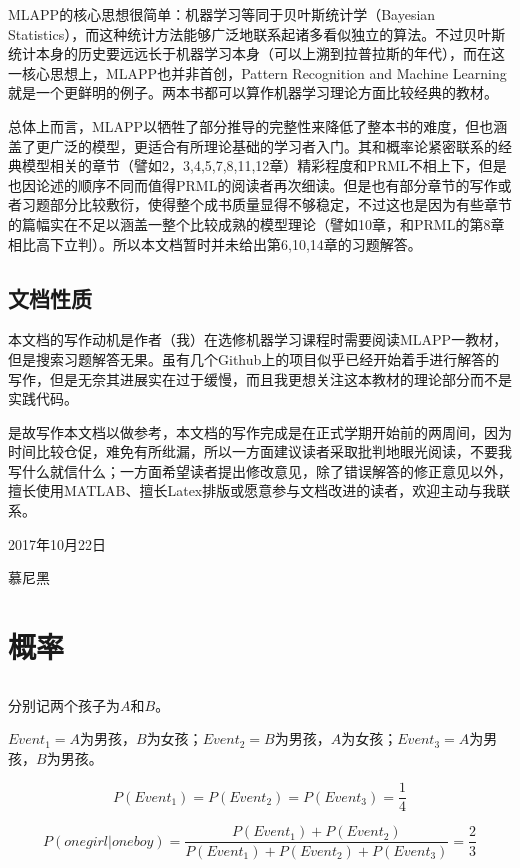 \documentclass[UTF8]{ctexart}
\begin{document}
MLAPP的核心思想很简单：机器学习等同于贝叶斯统计学（Bayesian Statistics），而这种统计方法能够广泛地联系起诸多看似独立的算法。不过贝叶斯统计本身的历史要远远长于机器学习本身（可以上溯到拉普拉斯的年代），而在这一核心思想上，MLAPP也并非首创，Pattern Recognition and Machine Learning就是一个更鲜明的例子。两本书都可以算作机器学习理论方面比较经典的教材。

总体上而言，MLAPP以牺牲了部分推导的完整性来降低了整本书的难度，但也涵盖了更广泛的模型，更适合有所理论基础的学习者入门。其和概率论紧密联系的经典模型相关的章节（譬如2，3,4,5,7,8,11,12章）精彩程度和PRML不相上下，但是也因论述的顺序不同而值得PRML的阅读者再次细读。但是也有部分章节的写作或者习题部分比较敷衍，使得整个成书质量显得不够稳定，不过这也是因为有些章节的篇幅实在不足以涵盖一整个比较成熟的模型理论（譬如10章，和PRML的第8章相比高下立判）。所以本文档暂时并未给出第6,10,14章的习题解答。

\subsection{文档性质}
本文档的写作动机是作者（我）在选修机器学习课程时需要阅读MLAPP一教材，但是搜索习题解答无果。虽有几个Github上的项目似乎已经开始着手进行解答的写作，但是无奈其进展实在过于缓慢，而且我更想关注这本教材的理论部分而不是实践代码。

是故写作本文档以做参考，本文档的写作完成是在正式学期开始前的两周间，因为时间比较仓促，难免有所纰漏，所以一方面建议读者采取批判地眼光阅读，不要我写什么就信什么；一方面希望读者提出修改意见，除了错误解答的修正意见以外，擅长使用MATLAB、擅长Latex排版或愿意参与文档改进的读者，欢迎主动与我联系。

2017年10月22日

慕尼黑

\newpage
\section{概率}
\subsection{}
分别记两个孩子为$A$和$B$。

$Event_{1}=A$为男孩，$B$为女孩；$Event_{2}=B$为男孩，$A$为女孩；$Event_{3}=A$为男孩，$B$为男孩。

$$P(Event_{1})=P(Event_{2})=P(Event_{3})=\frac{1}{4}$$

$$P(onegirl|oneboy)=\frac{P(Event_{1})+P(Event_{2})}{P(Event_{1})+P(Event_{2})+P(Event_{3})}=\frac{2}{3}$$
\end{document}
